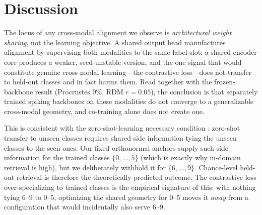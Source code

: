 \documentclass[conference]{IEEEtran}
\begin{document}
%

\section{Discussion}\label{sec:disc}
The locus of any cross-modal alignment we observe is \emph{architectural
weight sharing}, not the learning objective. A shared output head
manufactures alignment by supervising both modalities to the same label
slot; a shared encoder core produces a weaker, seed-unstable version; and
the one signal that would constitute genuine cross-modal learning---the
contrastive loss---does not transfer to held-out classes and in fact harms
them. Read together with the frozen-backbone result (Procrustes $0\%$, RDM
$r=0.05$), the conclusion is that separately trained spiking backbones on
these modalities do not converge to a generalizable cross-modal geometry,
and co-training alone does not create one.

This is consistent with the zero-shot-learning necessary condition
\cite{palatucci2009}: zero-shot transfer to unseen classes requires shared
side information tying the unseen classes to the seen ones. Our fixed
orthonormal anchors supply such side information for the trained classes
$\{0,\dots,5\}$ (which is exactly why in-domain retrieval is high), but we
deliberately withhold it for $\{6,\dots,9\}$. Chance-level held-out
retrieval is therefore the theoretically predicted outcome. The
contrastive loss over-specializing to trained classes is the
empirical signature of this: with nothing tying $6$--$9$ to $0$--$5$,
optimizing the shared geometry for $0$--$5$ moves it \emph{away} from a
configuration that would incidentally also serve $6$--$9$.
\end{document}

